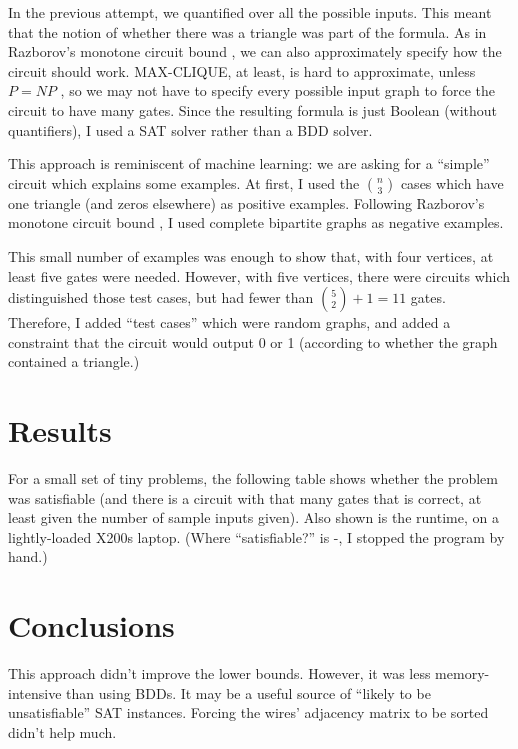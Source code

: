 \documentclass[12pt]{article}
\begin{document}
In the previous attempt, we quantified over all the possible inputs. This meant that the notion of
whether there was a triangle was part of the formula. As in Razborov's monotone circuit bound \cite{Razborov85lowerbounds}, we
can also approximately specify how the circuit should work.
MAX-CLIQUE, at least, is
hard to approximate, unless $P=NP$ \cite{hastad_clique_1999}, so we may not have to
specify every possible input graph to force the circuit to have many gates.
Since the resulting formula
is just Boolean (without quantifiers), I used a SAT solver \cite{een_extensible_2003}
rather than a BDD solver.

This approach is reminiscent of machine learning: we are asking for a ``simple'' circuit
which explains some examples. At first,
I used the $n \choose 3$ cases which have one triangle (and zeros elsewhere) as
positive examples. Following Razborov's monotone circuit bound \cite{Razborov85lowerbounds}, 
I used complete bipartite graphs as negative examples.

This small number of examples was enough to show that, with four vertices,
at least five gates were needed. However, with five vertices, there were
circuits which distinguished those test cases, but had fewer than ${5 \choose 2} + 1 = 11$ gates.
Therefore, I added ``test cases'' which were random graphs,
and added a constraint that the circuit would output 0 or 1 (according
to whether the graph contained a triangle.)

\section{Results}

For a small set of tiny problems, the following table shows whether the problem was satisfiable
(and there is a circuit with that many gates that is correct, at least given the number of
sample inputs given). Also shown is the runtime, on a
lightly-loaded X200s laptop. (Where ``satisfiable?'' is -, I stopped the program by hand.)


\section{Conclusions}

This approach didn't improve the lower bounds. However, it was
less memory-intensive than using BDDs. It may be a useful source
of ``likely to be unsatisfiable'' SAT instances.
Forcing the wires' adjacency matrix to be sorted didn't help much.
\end{document}
